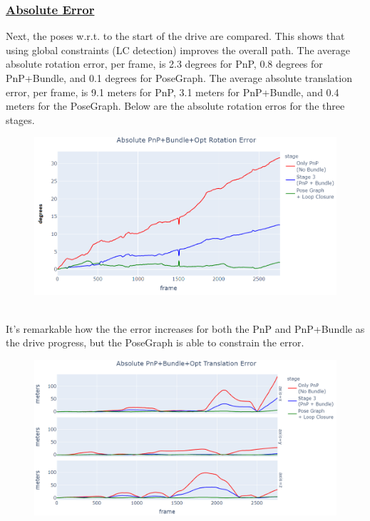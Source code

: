 \documentclass[12pt]{article}
\begin{document}
\subsubsection*{\underline{Absolute Error}}
Next, the poses w.r.t. to the start of the drive are compared. This shows that using global constraints (LC detection) improves the overall path. The average absolute rotation error, per frame, is 2.3 degrees for PnP, 0.8 degrees for PnP+Bundle, and 0.1 degrees for PoseGraph. The average absolute translation error, per frame, is 9.1 meters for PnP, 3.1 meters for PnP+Bundle, and 0.4 meters for the PoseGraph. Below are the absolute rotation erros for the three stages.
\begin{figure}[h]
\includegraphics[width=\textwidth]{Absolute PnP+Bundle+Opt Rotation Error}
\end{figure} \\
It's remarkable how the the error increases for both the PnP and PnP+Bundle as the drive progress, but the PoseGraph is able to constrain the error. 
\begin{figure}[h]
\includegraphics[width=\textwidth]{Absolute PnP+Bundle+Opt Translation Error}
\end{figure} \\
\end{document}
